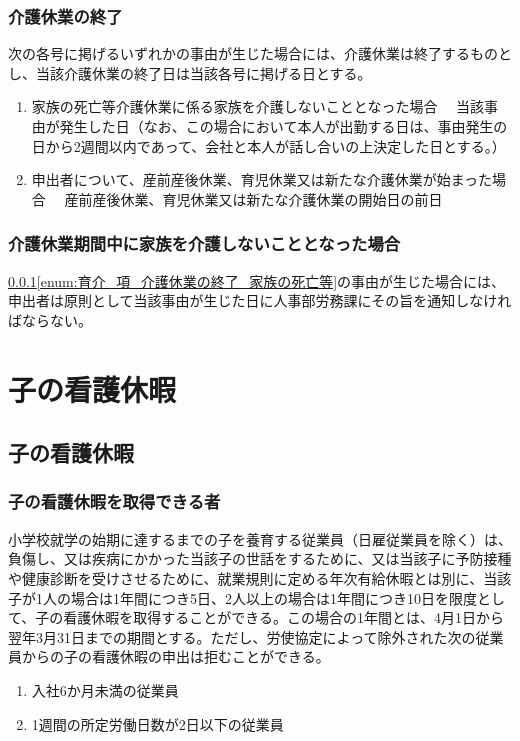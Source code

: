 \documentclass{jsarticle}
\begin{document}
\subsubsection{介護休業の終了}
\label{育介_項_介護休業の終了}
次の各号に掲げるいずれかの事由が生じた場合には、介護休業は終了するものとし、当該介護休業の終了日は当該各号に掲げる日とする。 
\begin{enumerate}
  \item 家族の死亡等介護休業に係る家族を介護しないこととなった場合\label{enum:育介_項_介護休業の終了_家族の死亡等}
        　当該事由が発生した日（なお、この場合において本人が出勤する日は、事由発生の日から2週間以内であって、会社と本人が話し合いの上決定した日とする。）
  \item 申出者について、産前産後休業、育児休業又は新たな介護休業が始まった場合
        　産前産後休業、育児休業又は新たな介護休業の開始日の前日
\end{enumerate}

\subsubsection{介護休業期間中に家族を介護しないこととなった場合}
\label{育介_項_介護休業期間中に家族を介護しないこととなった場合}
\ref{育介_項_介護休業の終了}\ref{enum:育介_項_介護休業の終了_家族の死亡等}の事由が生じた場合には、申出者は原則として当該事由が生じた日に人事部労務課にその旨を通知しなければならない。 

\section{子の看護休暇}

\subsection{子の看護休暇}
\label{育介_条_子の看護休暇}

\subsubsection{子の看護休暇を取得できる者}
\label{育介_項_子の看護休暇を取得できる者}
小学校就学の始期に達するまでの子を養育する従業員（日雇従業員を除く）は、負傷し、又は疾病にかかった当該子の世話をするために、又は当該子に予防接種や健康診断を受けさせるために、就業規則に定める年次有給休暇とは別に、当該子が1人の場合は1年間につき5日、2人以上の場合は1年間につき10日を限度として、子の看護休暇を取得することができる。この場合の1年間とは、4月1日から翌年3月31日までの期間とする。ただし、労使協定によって除外された次の従業員からの子の看護休暇の申出は拒むことができる。
\begin{enumerate}
  \item 入社6か月未満の従業員
  \item 1週間の所定労働日数が2日以下の従業員 
\end{enumerate}
\end{document}
